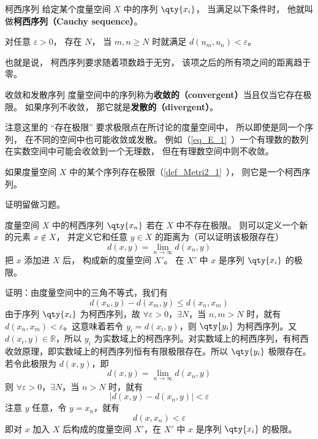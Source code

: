 

\begin{definition}{柯西序列}
给定某个度量空间 $X$ 中的序列 $\qty{x_i}$， 当满足以下条件时， 他就叫做\textbf{柯西序列（Cauchy sequence）}。

对任意 $\varepsilon > 0$， 存在 $N$， 当 $m, n \geqslant N$ 时就满足 $d(u_m, u_n) < \varepsilon$。
\end{definition}
也就是说， 柯西序列要求随着项数趋于无穷， 该项之后的所有项之间的距离趋于零。

\begin{definition}{收敛和发散序列}\label{def_cauchy_1}
度量空间中的序列称为\textbf{收敛的（convergent）}当且仅当它存在极限。 如果序列不收敛， 那它就是\textbf{发散的（divergent）}。
\end{definition}
注意这里的 “存在极限” 要求极限点在所讨论的度量空间中， 所以即使是同一个序列， 在不同的空间中也可能收敛或发散。 例如（\autoref{eq_E_1}~）一个有理数的数列在实数空间中可能会收敛到一个无理数， 但在有理数空间中则不收敛。

\begin{theorem}{}
如果度量空间 $X$ 中的某个序列存在极限（\autoref{def_Metri2_1}~）， 则它是一个柯西序列。
\end{theorem}
证明留做习题。

\begin{theorem}{}\label{the_cauchy_1}
度量空间 $X$ 中的柯西序列 $\qty{x_n}$ 若在 $X$ 中不存在极限。 则可以定义一个新的元素 $x \notin X$， 并定义它和任意 $y\in X$ 的距离为（可以证明该极限存在）
\begin{equation}
d(x, y) = \lim_{n\to\infty} d(x_n, y)
\end{equation}
把 $x$ 添加进 $X$ 后， 构成新的度量空间 $X'$。 在 $X'$ 中 $x$ 是序列 $\qty{x_i}$ 的极限。
\end{theorem}
证明：由度量空间中的三角不等式，我们有
\begin{equation}
d(x_n,y)-d(x_m,y)\leq d(x_n,x_m)
\end{equation}
由于序列 $\qty{x_i}$ 为柯西序列，故 $\forall\varepsilon>0$，$\exists N$，当 $n,m>N$ 时，就有 $d(x_n,x_m)<\varepsilon$。这意味着若令 $y_i=d(x_i,y)$，则 $\qty{y_i}$ 为柯西序列。又 $d(x_i,y)\in \mathbb R$，所以 ${y_i}$ 为实数域上的柯西序列。对实数域上的柯西序列，有柯西收敛原理，即实数域上的柯西序列恒有有限极限存在。所以 $\qty{y_i}$ 极限存在。若令此极限为 $d(x,y)$，即
\begin{equation}
d(x, y) = \lim_{n\to\infty} d(x_n, y)
\end{equation}
则 $\forall\varepsilon>0$，$\exists N$，当 $n>N$ 时，就有 
\begin{equation}
|d(x,y)-d(x_n,y)|<\varepsilon
\end{equation}
注意 $y$ 任意，令 $y=x_n$，就有
\begin{equation}
d(x,x_n)<\varepsilon
\end{equation}
即对 $x$ 加入 $X$ 后构成的度量空间 $X'$，在 $X'$ 中 $x$ 是序列 $\qty{x_i}$ 的极限。

